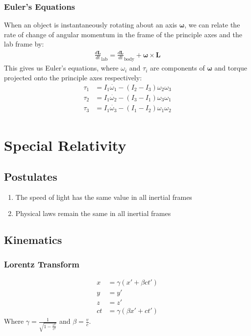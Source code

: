 \documentclass[11pt, letterpaper]{article}
\newcommand{\ve}[1]{
  \ensuremath{\bm{#1}}}	               %
\begin{document}
\begin{multicols*}{3}
\subsubsection{Euler's Equations}
When an object is instantaneously rotating about an axis $\ve{\omega}$, we can
relate the rate of change of angular momentum in the frame of the principle axes
and the lab frame by:
\begin{align*}
  \frac{d\ve{L}}{dt}_\text{lab} = \frac{d\ve{L}}{dt}_\text{body} + \ve{\omega}
  \times \ve{L}
\end{align*}
This gives us Euler's equations, where $\omega_i$ and $\tau_i$ are components of
$\ve{\omega}$ and torque projected onto the principle axes respectively:
\begin{align*}
  \tau_1 &= I_1\dot{\omega_1} - (I_2 - I_3)\omega_2\omega_3 \\
  \tau_2 &= I_1\dot{\omega_2} - (I_3 - I_1)\omega_3\omega_1 \\
  \tau_3 &= I_1\dot{\omega_3} - (I_1 - I_2)\omega_1\omega_2 \\
\end{align*}
\section{Special Relativity}
\subsection{Postulates}
\begin{enumerate}
\item The speed of light has the same value in all inertial frames
\item Physical laws remain the same in all inertial frames
\end{enumerate}
\subsection{Kinematics}
\subsubsection{Lorentz Transform}
\begin{align*}
  x&= \gamma (x' + \beta ct') \\
  y&=y' \\
  z&=z' \\
  ct&= \gamma (\beta x' + ct')
\end{align*}
Where $\gamma = \frac{1}{\sqrt{1-\frac{v^2}{c^2}}}$ and $\beta = \frac{v}{c}$.

\end{multicols*}
\end{document}
